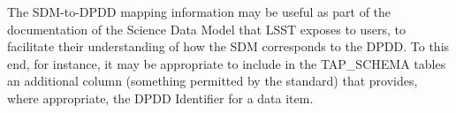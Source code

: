 The SDM-to-DPDD mapping information may be useful as part of the documentation of the Science Data Model that LSST exposes to users, to facilitate their understanding of how the SDM corresponds to the DPDD.  To this end, for instance, it may be appropriate to include in the TAP\_SCHEMA tables an additional column (something permitted by the standard) that provides, where appropriate, the DPDD Identifier for a data item.


